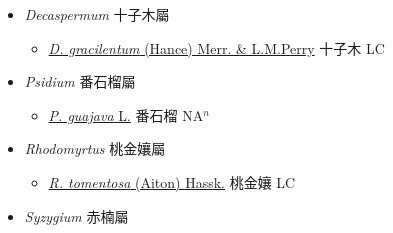 
  \begin{itemize}
 \item[] \textit{Decaspermum} 十子木屬
                    
  \begin{itemize}
        \item[] \href{http://www.theplantlist.org/tpl1.1/search?q=Decaspermum+gracilentum}{\textit{D. gracilentum} (Hance) Merr. \& L.M.Perry}   十子木 LC
  \end{itemize}
 \item[] \textit{Psidium} 番石榴屬
                    
  \begin{itemize}
        \item[] \href{http://www.theplantlist.org/tpl1.1/search?q=Psidium+guajava}{\textit{P. guajava} L.}   番石榴 NA$^n$
  \end{itemize}
 \item[] \textit{Rhodomyrtus} 桃金孃屬
                    
  \begin{itemize}
        \item[] \href{http://www.theplantlist.org/tpl1.1/search?q=Rhodomyrtus+tomentosa}{\textit{R. tomentosa} (Aiton) Hassk.}   桃金孃 LC
  \end{itemize}
 \item[] \textit{Syzygium} 赤楠屬
                    

\end{itemize}
